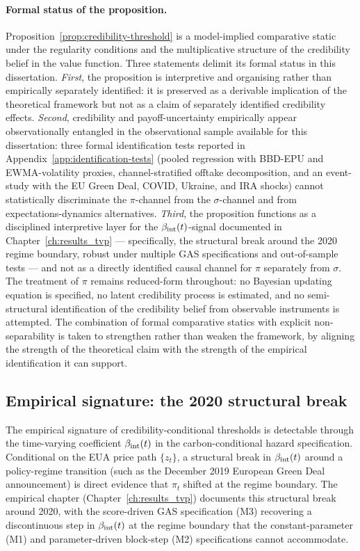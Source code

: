 \paragraph{Formal status of the proposition.}
Proposition~\ref{prop:credibility-threshold} is a model-implied comparative static under the regularity conditions and the multiplicative structure of the credibility belief in the value function. Three statements delimit its formal status in this dissertation. \emph{First}, the proposition is interpretive and organising rather than empirically separately identified: it is preserved as a derivable implication of the theoretical framework but not as a claim of separately identified credibility effects. \emph{Second}, credibility and payoff-uncertainty empirically appear observationally entangled in the observational sample available for this dissertation: three formal identification tests reported in Appendix~\ref{app:identification-tests} (pooled regression with BBD-EPU and EWMA-volatility proxies, channel-stratified offtake decomposition, and an event-study with the EU Green Deal, COVID, Ukraine, and IRA shocks) cannot statistically discriminate the $\pi$-channel from the $\sigma$-channel and from expectations-dynamics alternatives. \emph{Third}, the proposition functions as a disciplined interpretive layer for the $\beta_{\mathrm{int}}(t)$-signal documented in Chapter~\ref{ch:results_tvp} --- specifically, the structural break around the 2020 regime boundary, robust under multiple GAS specifications and out-of-sample tests --- and not as a directly identified causal channel for $\pi$ separately from $\sigma$. The treatment of $\pi$ remains reduced-form throughout: no Bayesian updating equation is specified, no latent credibility process is estimated, and no semi-structural identification of the credibility belief from observable instruments is attempted. The combination of formal comparative statics with explicit non-separability is taken to strengthen rather than weaken the framework, by aligning the strength of the theoretical claim with the strength of the empirical identification it can support.

\subsection{Empirical signature: the 2020 structural break}
\label{sec:ch3-credibility-empirics}

The empirical signature of credibility-conditional thresholds is detectable through the time-varying coefficient $\beta_{\mathrm{int}}(t)$ in the carbon-conditional hazard specification. Conditional on the EUA price path $\{z_t\}$, a structural break in $\beta_{\mathrm{int}}(t)$ around a policy-regime transition (such as the December 2019 European Green Deal announcement) is direct evidence that $\pi_t$ shifted at the regime boundary. The empirical chapter (Chapter~\ref{ch:results_tvp}) documents this structural break around 2020, with the score-driven GAS specification (M3) recovering a discontinuous step in $\beta_{\mathrm{int}}(t)$ at the regime boundary that the constant-parameter (M1) and parameter-driven block-step (M2) specifications cannot accommodate.

